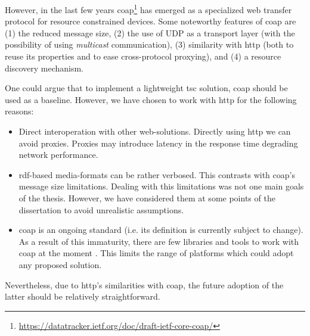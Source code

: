 However, in the last few years \acf{coap}\footnote{\url{https://datatracker.ietf.org/doc/draft-ietf-core-coap/}} has emerged as a specialized web transfer protocol for resource constrained devices. %
Some noteworthy features of \ac{coap} are
(1) the reduced message size,
(2) the use of UDP as a transport layer (with the possibility of using \emph{multicast} communication),
(3) similarity with \ac{http} (both to reuse its properties and to ease cross-protocol proxying), and
(4) a resource discovery mechanism. %


One could argue that to implement a lightweight \ac{tsc} solution, \ac{coap} should be used as a baseline.
However, we have chosen to work with \ac{http} for the following reasons:
\begin{itemize}
  \item Direct interoperation with other web-solutions.
        Directly using \ac{http} we can avoid proxies.
        Proxies may introduce latency in the response time degrading network performance. %
  \item \ac{rdf}-based media-formats can be rather verbosed.
	This contrasts with \ac{coap}'s message size limitations.
	Dealing with this limitations was not one main goals of the thesis.
	However, we have considered them at some points of the dissertation to avoid unrealistic assumptions.
  \item \ac{coap} is an ongoing standard (i.e. its definition is currently subject to change).
        As a result of this immaturity, there are few libraries and tools to work with \ac{coap} at the moment \citep{villaverde_constrained_2012}. %
        This limits the range of platforms which could adopt any proposed solution. %
\end{itemize}


Nevertheless, due to \ac{http}'s similarities with \ac{coap}, the future adoption of the latter should be relatively straightforward.

